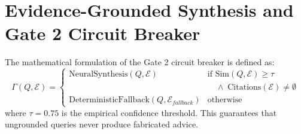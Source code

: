 \section{Evidence-Grounded Synthesis and Gate 2 Circuit Breaker}
\label{sec:gate2_circuit_breaker}
The mathematical formulation of the Gate 2 circuit breaker is defined as:
\begin{equation}
\Gamma(Q, \mathcal{E}) = 
\begin{cases} 
\text{NeuralSynthesis}(Q, \mathcal{E}) & \text{if } \text{Sim}(Q, \mathcal{E}) \ge \tau \\
                                       & \quad \land \; \text{Citations}(\mathcal{E}) \neq \emptyset \\
\text{DeterministicFallback}(Q, \mathcal{E}_{fallback}) & \text{otherwise}
\end{cases}
\label{eq:gate2_logic}
\end{equation}
where $\tau = 0.75$ is the empirical confidence threshold. This guarantees that ungrounded queries never produce fabricated advice.
